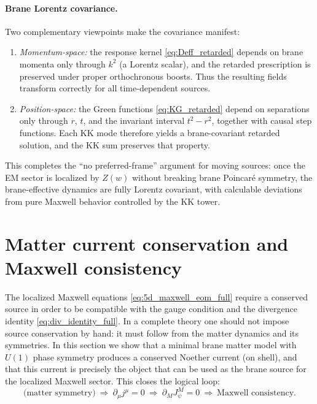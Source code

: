 \documentclass[11pt]{article}
\newcommand{\Z}{Z}
\newcommand{\Jpsi}{J_\psi}
\begin{document}
\paragraph{Brane Lorentz covariance.}
Two complementary viewpoints make the covariance manifest:

\begin{enumerate}
\item \emph{Momentum-space:} the response kernel \cref{eq:Deff_retarded} depends on
brane momenta only through \(k^2\) (a Lorentz scalar), and the retarded
prescription is preserved under proper orthochronous boosts. Thus the resulting
fields transform correctly for all time-dependent sources.

\item \emph{Position-space:} the Green functions \cref{eq:KG_retarded} depend on
separations only through \(r\), \(t\), and the invariant interval
\(t^2-r^2\), together with causal step functions. Each KK mode therefore yields a
brane-covariant retarded solution, and the KK sum preserves that property.
\end{enumerate}

This completes the ``no preferred-frame'' argument for moving sources: once the
EM sector is localized by \(\Z(w)\) without breaking brane Poincar\'e symmetry, the
brane-effective dynamics are fully Lorentz covariant, with calculable deviations
from pure Maxwell behavior controlled by the KK tower.

\section{Matter current conservation and Maxwell consistency}
\label{sec:matter_current}

The localized Maxwell equations \cref{eq:5d_maxwell_eom_full} require a conserved
source in order to be compatible with the gauge condition and the divergence
identity \cref{eq:div_identity_full}. In a complete theory one should not impose
source conservation by hand: it must follow from the matter dynamics and its
symmetries. In this section we show that a minimal brane matter model with
\(U(1)\) phase symmetry produces a conserved Noether current (on shell), and that
this current is precisely the object that can be used as the brane source for the
localized Maxwell sector. This closes the logical loop:
\[
\text{(matter symmetry)} \ \Rightarrow\ \partial_\mu j^\mu=0
\ \Rightarrow\ \partial_M \Jpsi^M=0
\ \Rightarrow\ \text{Maxwell consistency}.
\]
\end{document}
